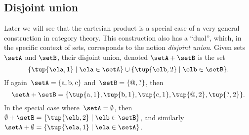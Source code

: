 \subsection{Disjoint union}

Later we will see that the cartesian product is a special case of a very general construction in category theory.
This construction also has a ``dual'', which, in the specific context of sets, corresponds to the notion \emph{disjoint union}.
Given sets $\setA$ and $\setB$, their disjoint union, denoted $\setA + \setB$ is the set
\begin{equation*}
    \{ \tup{\ela, 1} \mid \ela \in \setA \} \cup \{ \tup{\elb, 2} \mid \elb \in \setB \}.
\end{equation*}
If again~$\setA = \{ \text{a}, \text{b}, \text{c} \} $ and~$\setB = \{ @, ? \}$, then
\begin{equation*}
    \setA + \setB = \{ \tup{\text{a}, 1}, \tup{\text{b}, 1}, \tup{\text{c}, 1}, \tup{@, 2},  \tup{?, 2}\}.
\end{equation*}
In the special case where~$\setA = \emptyset$, then~$\emptyset + \setB = \{ \tup{\elb,2} \mid \elb \in \setB \}$, and similarly~$\setA + \emptyset =  \{ \tup{\ela,1} \mid \ela \in \setA \}$.



\clearpage

